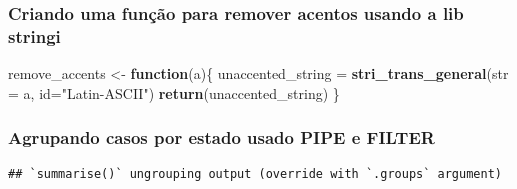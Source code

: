 \documentclass[
]{article}
\newenvironment{Shaded}{\begin{snugshade}}{\end{snugshade}}
\newcommand{\ControlFlowTok}[1]{\textcolor[rgb]{0.13,0.29,0.53}{\textbf{#1}}}
\newcommand{\DataTypeTok}[1]{\textcolor[rgb]{0.13,0.29,0.53}{#1}}
\newcommand{\KeywordTok}[1]{\textcolor[rgb]{0.13,0.29,0.53}{\textbf{#1}}}
\newcommand{\NormalTok}[1]{#1}
\newcommand{\OperatorTok}[1]{\textcolor[rgb]{0.81,0.36,0.00}{\textbf{#1}}}
\newcommand{\StringTok}[1]{\textcolor[rgb]{0.31,0.60,0.02}{#1}}
\begin{document}
\hypertarget{htmlwidget-d6d781e462eb4a921c2d}{}
\begin{plotly}

\end{plotly}

\hypertarget{criando-uma-funuxe7uxe3o-para-remover-acentos-usando-a-lib-stringi}{%
\subsubsection{Criando uma função para remover acentos usando a lib
stringi}\label{criando-uma-funuxe7uxe3o-para-remover-acentos-usando-a-lib-stringi}}

\begin{Shaded}
\begin{Highlighting}[]
\NormalTok{remove\_accents \textless{}{-}}\StringTok{ }\ControlFlowTok{function}\NormalTok{(a)\{}
\NormalTok{  unaccented\_string =}\StringTok{ }\KeywordTok{stri\_trans\_general}\NormalTok{(}\DataTypeTok{str =}\NormalTok{ a, }\DataTypeTok{id=}\StringTok{"Latin{-}ASCII"}\NormalTok{)}
  \KeywordTok{return}\NormalTok{(unaccented\_string)}
\NormalTok{\}}
\end{Highlighting}
\end{Shaded}

\hypertarget{agrupando-casos-por-estado-usado-pipe-e-filter}{%
\subsubsection{Agrupando casos por estado usado PIPE e
FILTER}\label{agrupando-casos-por-estado-usado-pipe-e-filter}}

\begin{Shaded}
\end{Shaded}

\begin{verbatim}
## `summarise()` ungrouping output (override with `.groups` argument)
\end{verbatim}
\end{document}

